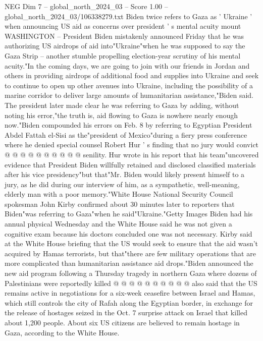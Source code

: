 \begin{textsample}{NEG Dim 7 – global\_north\_2024\_03 – Score 1.00 – global\_north\_2024\_03/106338279.txt}  \label{ex:f7_neg_423}
Biden twice refers to Gaza as ' Ukraine ' when announcing US aid as concerns over president ' s mental acuity mount WASHINGTON -- President Biden mistakenly announced Friday that he was authorizing US airdrops of aid into"Ukraine"when he was supposed to say the Gaza Strip -- another stumble propelling election-year scrutiny of his mental acuity."In the coming days, we are going to join with our friends in Jordan and others in providing airdrops of additional food and supplies into Ukraine and seek to continue to open up other avenues into Ukraine, including the possibility of a marine corridor to deliver large amounts of humanitarian assistance,"Biden said.
The president later made clear he was referring to Gaza by adding, without noting his error,"the truth is, aid flowing to Gaza is nowhere nearly enough now."Biden compounded his errors on Feb. 8 by referring to Egyptian President Abdel Fattah el-Sisi as the"president of Mexico"during a fiery press conference where he denied special counsel Robert Hur ' s finding that no jury would convict @ @ @ @ @ @ @ @ @ @ senility.
Hur wrote in his report that his team"uncovered evidence that President Biden willfully retained and disclosed classified materials after his vice presidency"but that"Mr.
Biden would likely present himself to a jury, as he did during our interview of him, as a sympathetic, well-meaning, elderly man with a poor memory."White House National Security Council spokesman John Kirby confirmed about 30 minutes later to reporters that Biden"was referring to Gaza"when he said"Ukraine."Getty Images Biden had his annual physical Wednesday and the White House said he was not given a cognitive exam because his doctors concluded one was not necessary.
Kirby said at the White House briefing that the US would seek to ensure that the aid wasn't acquired by Hamas terrorists, but that"there are few military operations that are more complicated than humanitarian assistance aid drops."Biden announced the new aid program following a Thursday tragedy in northern Gaza where dozens of Palestinians were reportedly killed @ @ @ @ @ @ @ @ @ @ also said that the US remains active in negotiations for a six-week ceasefire between Israel and Hamas, which still controls the city of Rafah along the Egyptian border, in exchange for the release of hostages seized in the Oct. 7 surprise attack on Israel that killed about 1,200 people.
About six US citizens are believed to remain hostage in Gaza, according to the White House.

\end{textsample}
